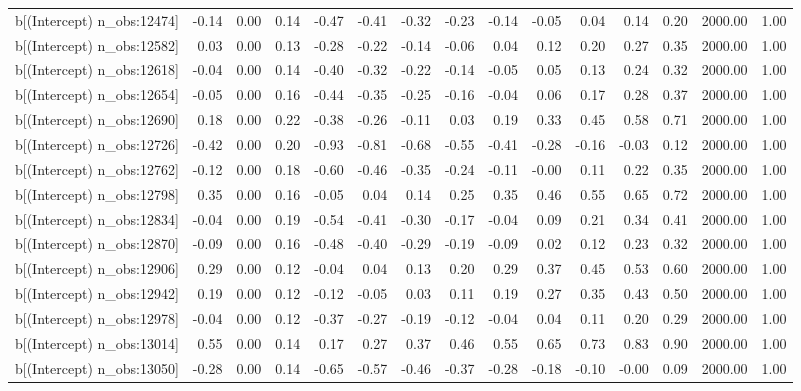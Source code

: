 \begin{table}[ht]
\begin{tabular}{rrrrrrrrrrrrrrr}
  b[(Intercept) n\_obs:12474] & -0.14 & 0.00 & 0.14 & -0.47 & -0.41 & -0.32 & -0.23 & -0.14 & -0.05 & 0.04 & 0.14 & 0.20 & 2000.00 & 1.00 \\ 
  b[(Intercept) n\_obs:12582] & 0.03 & 0.00 & 0.13 & -0.28 & -0.22 & -0.14 & -0.06 & 0.04 & 0.12 & 0.20 & 0.27 & 0.35 & 2000.00 & 1.00 \\ 
  b[(Intercept) n\_obs:12618] & -0.04 & 0.00 & 0.14 & -0.40 & -0.32 & -0.22 & -0.14 & -0.05 & 0.05 & 0.13 & 0.24 & 0.32 & 2000.00 & 1.00 \\ 
  b[(Intercept) n\_obs:12654] & -0.05 & 0.00 & 0.16 & -0.44 & -0.35 & -0.25 & -0.16 & -0.04 & 0.06 & 0.17 & 0.28 & 0.37 & 2000.00 & 1.00 \\ 
  b[(Intercept) n\_obs:12690] & 0.18 & 0.00 & 0.22 & -0.38 & -0.26 & -0.11 & 0.03 & 0.19 & 0.33 & 0.45 & 0.58 & 0.71 & 2000.00 & 1.00 \\ 
  b[(Intercept) n\_obs:12726] & -0.42 & 0.00 & 0.20 & -0.93 & -0.81 & -0.68 & -0.55 & -0.41 & -0.28 & -0.16 & -0.03 & 0.12 & 2000.00 & 1.00 \\ 
  b[(Intercept) n\_obs:12762] & -0.12 & 0.00 & 0.18 & -0.60 & -0.46 & -0.35 & -0.24 & -0.11 & -0.00 & 0.11 & 0.22 & 0.35 & 2000.00 & 1.00 \\ 
  b[(Intercept) n\_obs:12798] & 0.35 & 0.00 & 0.16 & -0.05 & 0.04 & 0.14 & 0.25 & 0.35 & 0.46 & 0.55 & 0.65 & 0.72 & 2000.00 & 1.00 \\ 
  b[(Intercept) n\_obs:12834] & -0.04 & 0.00 & 0.19 & -0.54 & -0.41 & -0.30 & -0.17 & -0.04 & 0.09 & 0.21 & 0.34 & 0.41 & 2000.00 & 1.00 \\ 
  b[(Intercept) n\_obs:12870] & -0.09 & 0.00 & 0.16 & -0.48 & -0.40 & -0.29 & -0.19 & -0.09 & 0.02 & 0.12 & 0.23 & 0.32 & 2000.00 & 1.00 \\ 
  b[(Intercept) n\_obs:12906] & 0.29 & 0.00 & 0.12 & -0.04 & 0.04 & 0.13 & 0.20 & 0.29 & 0.37 & 0.45 & 0.53 & 0.60 & 2000.00 & 1.00 \\ 
  b[(Intercept) n\_obs:12942] & 0.19 & 0.00 & 0.12 & -0.12 & -0.05 & 0.03 & 0.11 & 0.19 & 0.27 & 0.35 & 0.43 & 0.50 & 2000.00 & 1.00 \\ 
  b[(Intercept) n\_obs:12978] & -0.04 & 0.00 & 0.12 & -0.37 & -0.27 & -0.19 & -0.12 & -0.04 & 0.04 & 0.11 & 0.20 & 0.29 & 2000.00 & 1.00 \\ 
  b[(Intercept) n\_obs:13014] & 0.55 & 0.00 & 0.14 & 0.17 & 0.27 & 0.37 & 0.46 & 0.55 & 0.65 & 0.73 & 0.83 & 0.90 & 2000.00 & 1.00 \\ 
  b[(Intercept) n\_obs:13050] & -0.28 & 0.00 & 0.14 & -0.65 & -0.57 & -0.46 & -0.37 & -0.28 & -0.18 & -0.10 & -0.00 & 0.09 & 2000.00 & 1.00 \\ 

\end{tabular}
\end{table}
